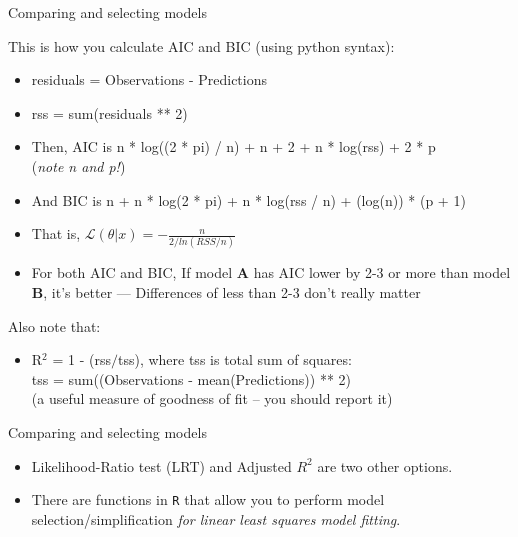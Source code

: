 \documentclass[xcolor=x11names,handout,compress]{beamer}
\renewcommand{\(}{\begin{columns}}
\renewcommand{\)}{\end{columns}}
\newcommand{\<}[1]{\begin{column}{#1}}
\renewcommand{\>}{\end{column}}
\begin{document}
\begin{frame}{Comparing and selecting models}

This is how you calculate AIC and BIC (using python syntax): 

\pause
\begin{itemize}
\small
	\item residuals = Observations - Predictions
	\item rss = sum(residuals ** 2) 
	\item Then, AIC is n * log((2 * pi) / n) + n + 2 + n * log(rss) + 2 * p \\
		({\it note n and p!})
	\item And BIC is n + n * log(2 * pi) + n * log(rss / n) + (log(n)) * (p + 1)

	\item That is, 	$ \mathcal{L}(\theta |x) = -\frac{n}{2/ln(RSS/n)}$
	\item For both AIC and BIC, If model {\bf A} has AIC lower by 2-3 or 
	more than model {\bf B}, it's better --- Differences of less than 2-3 
	don't really matter


\end{itemize}

    \pause
Also note that:
\begin{itemize}
\small
	\item R$^{2}$ = 1 - (rss$/$tss), where tss is total sum of squares: \\
tss = sum((Observations - mean(Predictions)) ** 2)\\
(a useful measure of goodness of fit -- you should report it)

\end{itemize}

\end{frame}


\begin{frame}{Comparing and selecting models}

\begin{itemize} \itemsep12pt
	\item Likelihood-Ratio test (LRT) and Adjusted $R^2$ are two other options. 
	\item There are functions in {\tt R} that allow you to perform model selection/simplification {\it for linear least squares model fitting}.  
\end{itemize}

\end{frame}
\end{document}
